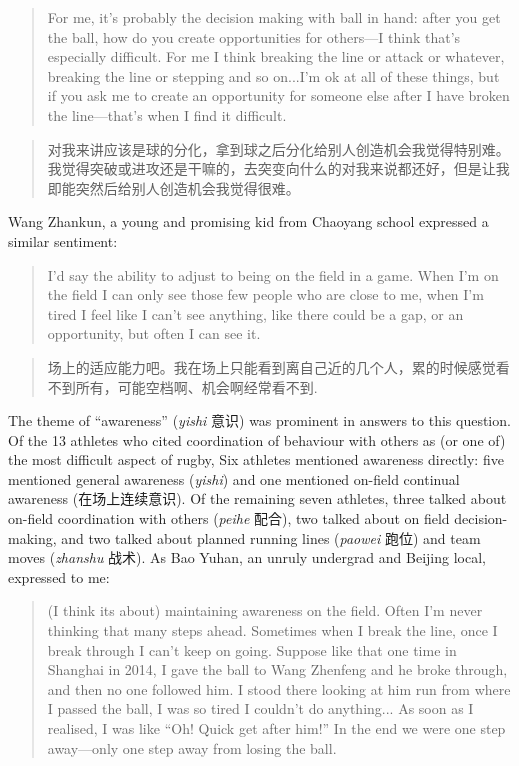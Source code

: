 \begin{CJK}{UTF8}{gbsn}
\begin{quotation}
  For me, it's probably the decision making with ball in hand: after you get the ball, how do you create opportunities for others---I think that's especially difficult.  For me I think breaking the line or attack or whatever, breaking the line or stepping and so on...I'm ok at all of these things, but if you ask me to create an opportunity for someone else after I have broken the line---that's when I find it difficult.
\end{quotation}

\begin{quotation}
  对我来讲应该是球的分化，拿到球之后分化给别人创造机会我觉得特别难。我觉得突破或进攻还是干嘛的，去突变向什么的对我来说都还好，但是让我即能突然后给别人创造机会我觉得很难。
\end{quotation}

Wang Zhankun, a young and promising kid from Chaoyang school expressed a similar sentiment:

\begin{quotation}
  I’d say the ability to adjust to being on the field in a game.  When I’m on the field I can only see those few people who are close to me, when I’m tired I feel like I can’t see anything, like there could be a gap, or an opportunity, but often I can see it.
\end{quotation}

\begin{quotation}
  场上的适应能力吧。我在场上只能看到离自己近的几个人，累的时候感觉看不到所有，可能空档啊、机会啊经常看不到.
\end{quotation}

The theme of ``awareness'' (\textit{yishi} 意识) was prominent in answers to this question. Of the 13 athletes who cited coordination of behaviour with others as (or one of) the most difficult aspect of rugby,  Six athletes mentioned awareness directly: five mentioned general awareness (\textit{yishi}) and one mentioned on-field continual awareness (在场上连续意识).  Of the remaining seven athletes, three talked about on-field coordination with others (\textit{peihe} 配合), two talked about on field decision-making, and two talked about planned running lines (\textit{paowei} 跑位) and team moves (\textit{zhanshu} 战术). As Bao Yuhan, an unruly undergrad and Beijing local, expressed to me:

  \begin{quotation}
    (I think its about) maintaining awareness on the field. Often I'm never thinking that many steps ahead.  Sometimes when I break the line, once I break through I can't keep on going.  Suppose like that one time in Shanghai in 2014, I gave the ball to Wang Zhenfeng and he broke through, and then no one followed him.  I stood there looking at him run from where I passed the ball, I was so tired I couldn't do anything... As soon as I realised, I was like ``Oh! Quick get after him!'' In the end we were one step away---only one step away from losing the ball.
  \end{quotation}


\end{CJK}
